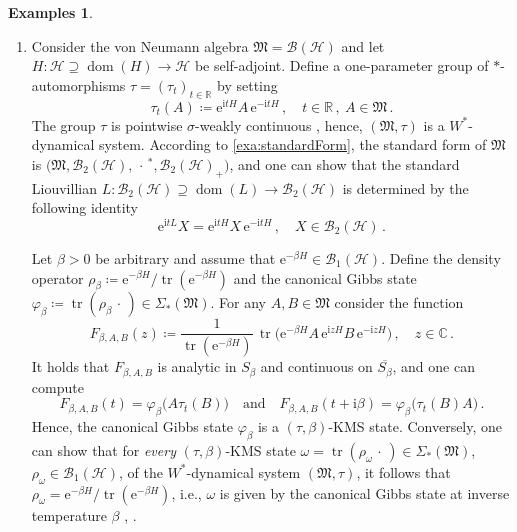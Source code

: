 \documentclass[a4paper, twoside, 11pt, reqno]{amsart}
\theoremstyle{definition}
\newtheorem{examples}[definition]{Examples}
\theoremstyle{plain}
\renewcommand{\supset}{\supseteq}
\renewcommand{\Sigma}{\varSigma}
\newcommand{\R}{\mathbb{R}}
\newcommand{\C}{\mathbb{C}}
\newcommand{\MH}{\mathcal{H}}
\newcommand{\MFM}{\mathfrak{M}}
\newcommand{\ii}{\mathrm{i}}
\newcommand{\ee}{\mathrm{e}}
\newcommand{\BO}{\mathscr{B}}
\newcommand{\NO}{\BO_1}
\newcommand{\HS}{\BO_2}
\newcommand{\NS}[1]{\Sigma_{\ast}(#1)}
\newcommand{\1}{\mathbf{1}}
\DeclareMathOperator{\dom}{dom}
\DeclareMathOperator{\tr}{tr}
\newcommand{\ce}{\coloneqq}
\newcommand{\oln}[1]{\overline{#1}}
\newcommand{\com}{{\, , \quad}}
\begin{document}
\begin{examples}\label{exa:LiouvillianKMS}
    \leavevmode
    \begin{enumerate}[env]
        \item \label{enu:finiteQuantumSystem} Consider the von Neumann algebra $\MFM = \BO(\MH)$ and let $H : \MH \supset \dom(H) \to \MH$ be self-adjoint. Define a one-parameter group of $\ast$-automorphisms $\tau = (\tau_t)_{t \in \R}$ by setting
        \begin{equation*}
            \tau_t(A) \ce \ee^{\ii t H} A \, \ee^{- \ii t H} \, , \quad t \in \R \, , \ A \in \MFM \, .
        \end{equation*}
        The group $\tau$ is pointwise $\sigma$-weakly continuous \cite[Exa. 4.16]{Pillet2006}, hence, $(\MFM, \tau)$ is a $W^\ast$-dynamical system. According to \cref{exa:standardForm}, the standard form of $\MFM$ is $\bigl(\MFM, \HS(\MH), \,\cdot\,^\ast, \HS(\MH)_+\bigr)$, and one can show that the standard Liouvillian $L : \HS(\MH) \supset \dom(L) \to \HS(\MH)$ is determined by the following identity \cite[Exa. 4.51]{Pillet2006}
        \begin{equation*}
            \ee^{\ii t L} X = \ee^{\ii t H} X \, \ee^{- \ii t H} \com X \in \HS(\MH) \, .
        \end{equation*}

        Let $\beta > 0$ be arbitrary and assume that $\ee^{- \beta H} \in \NO(\MH)$. Define the density operator $\rho_\beta \ce \ee^{- \beta H} / \tr(\ee^{- \beta H})$ and the canonical Gibbs state $\varphi_\beta \ce \tr(\rho_\beta \,\cdot\,) \in \NS{\MFM}$. For any $A, B \in \MFM$ consider the function \cite[p. 21]{Hiai2021}
        \begin{equation*}
            F_{\beta, A, B}(z) \ce \frac{1}{\tr (\ee^{- \beta H})} \, \tr\bigl(\ee^{- \beta H} A \, \ee^{\ii z H} B \, \ee^{- \ii z H}\bigr) \, , \quad z \in \C \, .
        \end{equation*}
        It holds that $F_{\beta, A, B}$ is analytic in $S_\beta$ and continuous on $\oln{S_\beta}$, and one can compute
        \begin{equation*}
            F_{\beta, A, B}(t) = \varphi_\beta\bigl(A \tau_t(B)\bigr) \quad \text{and} \quad F_{\beta, A, B}(t + \ii \beta) = \varphi_\beta\bigl(\tau_t(B) A\bigr) \, .
        \end{equation*}
        Hence, the canonical Gibbs state $\varphi_\beta$ is a $(\tau, \beta)$-KMS state. Conversely, one can show that for \emph{every} $(\tau, \beta)$-KMS state $\omega = \tr(\rho_\omega \,\cdot\,) \in \NS{\MFM}$, $\rho_\omega \in \NO(\MH)$, of the $W^\ast$-dynamical system $(\MFM, \tau)$, it follows that $\rho_\omega = \ee^{- \beta H} / \tr(\ee^{- \beta H})$, i.e., $\omega$ is given by the canonical Gibbs state at inverse temperature $\beta$ \cite[Prop. 4.7]{Attal2006}, \cite[Exa. 5.5]{Pillet2006}.


\end{enumerate}
\end{examples}
\end{document}

